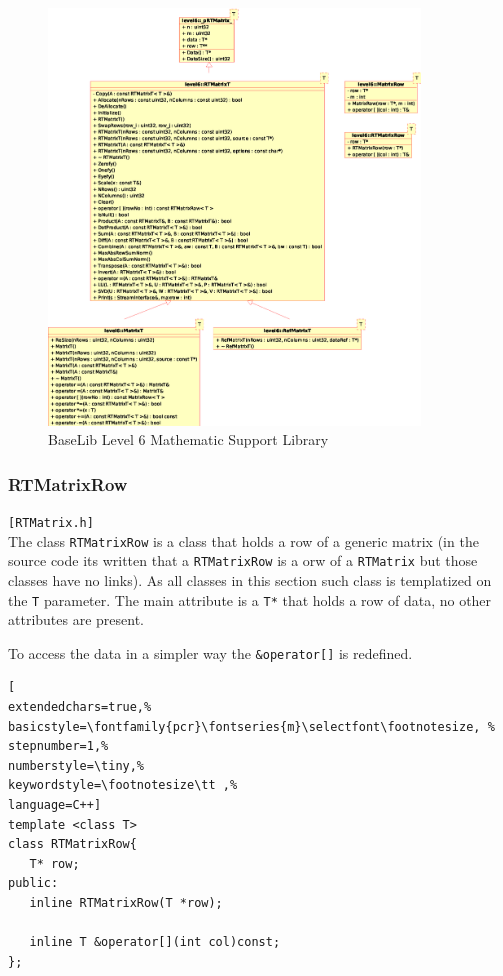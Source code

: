 \begin{figure}[h!]
 \begin{center}
  \includegraphics[width=0.88\textwidth]{level6/level6-math-matrix.eps}
  \caption{BaseLib Level 6 Mathematic Support Library}
  \label{f:level6:math-matrix}
 \end{center}
\end{figure}



\subsubsection{RTMatrixRow}
\texttt{[RTMatrix.h]}\\
The class \texttt{RTMatrixRow} is a class that holds a row of a generic matrix (in the source code its written that a \texttt{RTMatrixRow} is a orw of a \texttt{RTMatrix} but those classes have no links). As all classes in this section such class is templatized on the \texttt{T} parameter. The main attribute is a \texttt{T*} that holds a row of data, no other attributes are present.

To access the data in a simpler way the \texttt{\&operator[]} is redefined.

\begin{lstlisting}[
extendedchars=true,%
basicstyle=\fontfamily{pcr}\fontseries{m}\selectfont\footnotesize, %
stepnumber=1,%
numberstyle=\tiny,%
keywordstyle=\footnotesize\tt ,%
language=C++]
template <class T>
class RTMatrixRow{
   T* row;
public:
   inline RTMatrixRow(T *row);

   inline T &operator[](int col)const;
};
\end{lstlisting}




